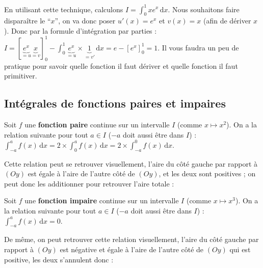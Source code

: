 	\begin{tip}[Exemple]
		En utilisant cette technique, calculons $\displaystyle{I = \int_{0}^1 xe^x \, \mathrm{d}x}$. Nous souhaitons faire disparaître le ``$x$'', on va donc poser $u'(x) = e^x$ et $v(x) = x$ (afin de dériver $x$).
		\newpar
		Donc par la formule d'intégration par parties :
		\newpar
		$\displaystyle{I = \left[\underbrace{e^x}_{= u} \underbrace{x}_{= v}\right]_0^1 - \int_{0}^1 \underbrace{e^x}_{= u} \times \underbrace{1}_{= v'} \, \mathrm{d}x = e - \left[ e^x \right]_0^1 = 1}$.
		\newpar
		Il vous faudra un peu de pratique pour savoir quelle fonction il faut dériver et quelle fonction il faut primitiver.
	\end{tip}
	
	\subsection{Intégrales de fonctions paires et impaires}
	\label{integrales-paires-impaires}
	
	\begin{formula}
		Soit $f$ une \textbf{fonction paire} continue sur un intervalle $I$ (comme $x \mapsto x^2$).
		\newpar
		On a la relation suivante pour tout $a \in I$ ($-a$ doit aussi être dans $I$) :
		\newpar
		$\displaystyle{\int_{-a}^{a} f(x) \, \mathrm{d}x = 2 \times \int_{0}^{a} f(x) \, \mathrm{d}x = 2 \times \int_{-a}^{0} f(x) \, \mathrm{d}x}$.
	\end{formula}
	
	\begin{tip}[Exemple]
		Cette relation peut se retrouver visuellement, l'aire du côté gauche par rapport à $(Oy)$ est égale à l'aire de l'autre côté de $(Oy)$, et les deux sont positives ; on peut donc les additionner pour retrouver l'aire totale :
	\end{tip}
	
	\begin{formula}
		Soit $f$ une \textbf{fonction impaire} continue sur un intervalle $I$ (comme $x \mapsto x^3$).
		\newpar
		On a la relation suivante pour tout $a \in I$ ($-a$ doit aussi être dans $I$) :
		\newpar
		$\displaystyle{\int_{-a}^{a} f(x) \, \mathrm{d}x = 0}$.
	\end{formula}
	
	\begin{tip}[Exemple]
		De même, on peut retrouver cette relation visuellement, l'aire du côté gauche par rapport à $(Oy)$ est négative et égale à l'aire de l'autre côté de $(Oy)$ qui est positive, les deux s'annulent donc :
	\end{tip}
	
